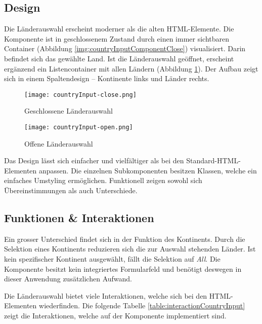 \subsection{Design}
\label{sec:countryChoiceDesign}

Die Länderauswahl erscheint moderner als die alten HTML-Elemente. 
Die Komponente ist in geschlossenem Zustand durch einen immer sichtbaren Container (Abbildung \ref{img:countryInputComponentClose}) visualisiert. 
Darin befindet sich das gewählte Land. 
Ist die Länderauswahl geöffnet, erscheint ergänzend ein Listencontainer mit allen Ländern (Abbildung \ref{img:countryInputComponentOpen}). 
Der Aufbau zeigt sich in einem Spaltendesign – Kontinente links und Länder rechts. 

\begin{figure}[!htb]
    \centering
    \begin{minipage}[b]{0.5\textwidth}
        \centering
        \texttt{[image: countryInput-close.png]}
        \caption{\centering Geschlossene Länderauswahl}
        \label{img:countryInputComponentClose}
    \end{minipage}
    \hfill
    \begin{minipage}[b]{0.45\textwidth}
        \centering
        \texttt{[image: countryInput-open.png]}
        \caption{\centering Offene Länderauswahl}
        \label{img:countryInputComponentOpen}
    \end{minipage}
\end{figure}

Das Design lässt sich einfacher und vielfältiger als bei den Standard-HTML-Elementen anpassen. 
Die einzelnen Subkomponenten besitzen Klassen, welche ein einfaches Umstyling ermöglichen. 
Funktionell zeigen sowohl sich Übereinstimmungen als auch Unterschiede. 


\subsection{Funktionen \& Interaktionen}
\label{sec:countryChoiceFunction}

Ein grosser Unterschied findet sich in der Funktion des Kontinents. 
Durch die Selektion eines Kontinents reduzieren sich die zur Auswahl stehenden Länder. 
Ist kein spezifischer Kontinent ausgewählt, fällt die Selektion auf \emph{All}. 
Die Komponente besitzt kein integriertes Formularfeld und benötigt deswegen in dieser Anwendung zusätzlichen Aufwand. 

Die Länderauswahl bietet viele Interaktionen, welche sich bei den HTML-Elementen wiederfinden. 
Die folgende Tabelle \ref{table:interactionCountryInput} zeigt die Interaktionen, welche auf der Komponente implementiert sind. 

